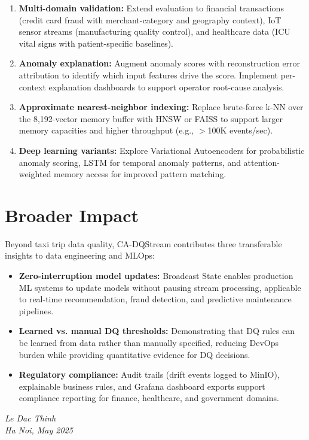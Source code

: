 \begin{enumerate}
    \item \textbf{Multi-domain validation:} Extend evaluation to financial transactions (credit card fraud with merchant-category and geography context), IoT sensor streams (manufacturing quality control), and healthcare data (ICU vital signs with patient-specific baselines).

    \item \textbf{Anomaly explanation:} Augment anomaly scores with reconstruction error attribution to identify which input features drive the score. Implement per-context explanation dashboards to support operator root-cause analysis.

    \item \textbf{Approximate nearest-neighbor indexing:} Replace brute-force k-NN over the 8,192-vector memory buffer with HNSW or FAISS to support larger memory capacities and higher throughput (e.g., $>$100K events/sec).

    \item \textbf{Deep learning variants:} Explore Variational Autoencoders for probabilistic anomaly scoring, LSTM for temporal anomaly patterns, and attention-weighted memory access for improved pattern matching.
\end{enumerate}

\section{Broader Impact}

Beyond taxi trip data quality, CA-DQStream contributes three transferable insights to data engineering and MLOps:

\begin{itemize}
    \item \textbf{Zero-interruption model updates:} Broadcast State enables production ML systems to update models without pausing stream processing, applicable to real-time recommendation, fraud detection, and predictive maintenance pipelines.
    \item \textbf{Learned vs. manual DQ thresholds:} Demonstrating that DQ rules can be learned from data rather than manually specified, reducing DevOps burden while providing quantitative evidence for DQ decisions.
    \item \textbf{Regulatory compliance:} Audit trails (drift events logged to MinIO), explainable business rules, and Grafana dashboard exports support compliance reporting for finance, healthcare, and government domains.
\end{itemize}

\vspace{1.5cm}
\begin{flushright}
\textit{Le Dac Thinh} \\
\textit{Ha Noi, May 2025}
\end{flushright}
